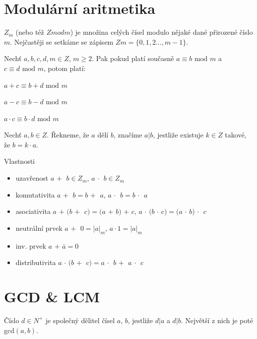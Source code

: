 \documentclass{szzclass}
\begin{document}
\tableofcontents
\newpage

\section{Modulární aritmetika}
$Z_m$ (nebo též $Z mod m$) je množina celých čísel modulo nějaké dané přirozené číslo $m$. Nejčastěji se
setkáme se zápisem $Zm = \{0, 1, 2 . . . , m - 1\}$.

Nechť $a, b, c, d, m \in Z$, $m \geq 2$. Pak pokud platí současně $a \equiv b \text{ mod } m$ a $c \equiv d \text{ mod } m$, potom platí:

\begin{center}
$a + c \equiv b + d \text{ mod } m$

$a - c \equiv b - d \text{ mod } m$

$a \cdot c \equiv b \cdot d \text{ mod } m$
\end{center}

Nechť $a, b \in Z$. Řekneme, že $a$ dělí $b$, značíme $a|b$, jestliže
existuje $k \in Z$ takové, že $b = k \cdot a$.

Vlastnosti
\begin{itemize}
    \item uzavřenost $a$ \textcircled{$+$} $b \in Z_m$, $a$ \textcircled{$\cdot$} $b \in Z_m$
    \item komutativita $a$ \textcircled{$+$} $b = b$ \textcircled{$+$} $a$, $a$ \textcircled{$\cdot$} $b = b$ \textcircled{$\cdot$} $a$
    \item asociativita $a$ \textcircled{$+$} $(b$ \textcircled{$+$} $c) = (a$ \textcircled{$+$} $b)$ \textcircled{$+$} $c$,
    $a$ \textcircled{$\cdot$} $(b$ \textcircled{$\cdot$} $c) = (a$ \textcircled{$\cdot$} $b)$ \textcircled{$\cdot$} $c$
    \item neutrální prvek $a$ \textcircled{$+$} $0 = |a|_m$, $a \cdot 1 = |a|_m$
    \item inv. prvek $a$ \textcircled{$+$} $\bar{a} = 0$
    \item distributivita $a$ \textcircled{$\cdot$} $(b$ \textcircled{$+$} $c) = a$ \textcircled{$\cdot$} $b$ \textcircled{$+$} $a$ \textcircled{$\cdot$} $c$
\end{itemize}

\newpage

\section{GCD \& LCM}
Číslo $d \in N^+$ je společný dělitel čísel $a$, $b$, jestliže $d|a$ a $d|b$. Největší z nich je poté gcd$(a,b)$.
\end{document}
